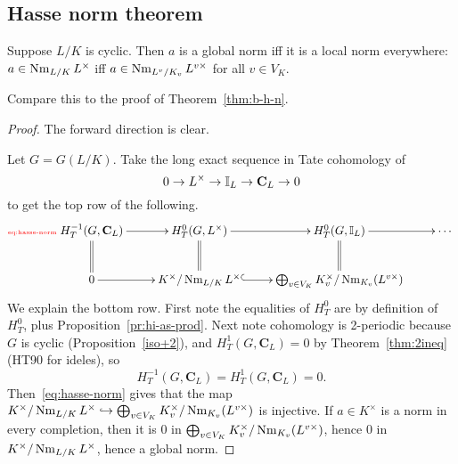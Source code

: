 \subsection{Hasse norm theorem}
\begin{thm}
Suppose $L/K$ is cyclic. Then $a$ is a global norm iff it is a local norm everywhere: $a\in \operatorname{Nm}_{L/K} L^{\times}$ iff $a\in \operatorname{Nm}_{L^v/K_v}L^{v\times}$ for all $v\in V_K$.
\end{thm}
Compare this to the proof of Theorem~\ref{thm:b-h-n}.
\begin{proof}
The forward direction is clear.

Let $G=G(L/K)$. Take the long exact sequence in Tate cohomology of
\[
0\to L^{\times}\to \mathbb{I}_L\to \mathbf C_L\to 0
\]
to get the top row of the following.
\begin{equation}\llabel{eq:hasse-norm}
\xymatrix{
H^{-1}_T(G,\mathbf C_L)\ar@{=}[d]
\ar[r] & H_T^0(G,L^{\times}) \ar[r]\ar@{=}[d] & 
H_T^0(G,\I_L)\ar[r]\ar@{=}[d] & \cdots\\
0 \ar[r] & K^{\times} /\nm_{L/K}L^{\times} \ar@{^(->}[r]&\bigopl_{v\in V_K} K_v^{\times}/\nm_{K_v}(L^{v\times})&
}
\end{equation}
We explain the bottom row. First note the equalities of $H_T^0$ are by definition of $H_T^0$, plus Proposition~\ref{pr:hi-as-prod}.
Next note cohomology is 2-periodic because $G$ is cyclic (Proposition~\ref{iso+2}), and $H_T^1(G,\mathbf C_L)=0$ by Theorem~\ref{thm:2ineq} (HT90 for ideles), so
\[
H_T^{-1}(G,\mathbf C_L)=H_T^1(G,\mathbf C_L)=0.
\]
Then~\eqref{eq:hasse-norm} gives that the map $K^{\times} /\operatorname{Nm}_{L/K}L^{\times} \hookrightarrow \bigoplus_{v\in V_K} K_v^{\times}/\operatorname{Nm}_{K_v}(L^{v\times})$ is injective. If $a\in K^{\times}$ is a norm in every completion, then it is 0 in $\bigoplus_{v\in V_K} K_v^{\times}/\operatorname{Nm}_{K_v}(L^{v\times})$, hence 0 in $K^{\times} /\operatorname{Nm}_{L/K}L^{\times}$, hence a global norm.
\end{proof}
